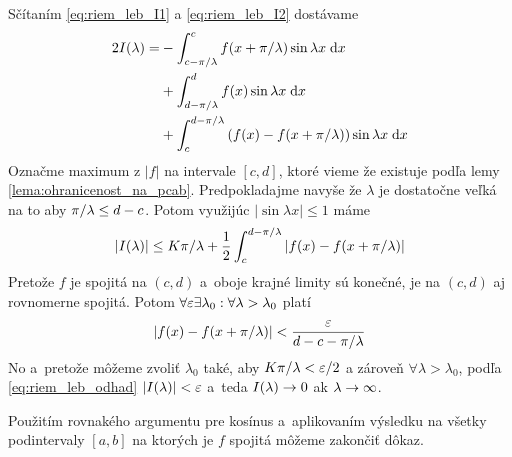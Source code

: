 \begin{dokaz}
    Sčítaním \eqref{eq:riem_leb_I1} a \eqref{eq:riem_leb_I2} dostávame
    \begin{equation*}
    \begin{split}
        2I(\lambda) =&-\int_{c-\pi/\lambda}^c f(x+\pi/\lambda) \sin \lambda x \; \mathrm{d} x 
                \\ &+
                \int_{d-\pi/\lambda}^d f(x) \sin \lambda x \; \mathrm{d} x \\
                &+
                \int_c^{d-\pi/\lambda} \left( 
                    f(x) - f(x+\pi/\lambda)
                    \right) \sin \lambda x \; \mathrm{d} x
    \end{split}
    \end{equation*}
    Označme maximum z $|f|$ na intervale $[c,d]$, ktoré vieme že
    existuje podľa lemy \eqref{lema:ohranicenost_na_pcab}.
    Predpokladajme navyše že $\lambda$ je dostatočne veľká na to aby
    $\pi/\lambda \le d-c$. Potom využijúc $|\sin \lambda x|\le1$ máme
    \begin{equation}
        |I(\lambda)| \le K \pi/\lambda + \frac{1}{2} \int_c^{d-\pi/\lambda}
            \left|f(x) - f(x+\pi/\lambda)\right|
        \label{eq:riem_leb_odhad}
    \end{equation}
    Pretože $f$ je spojitá na $(c,d)$ a~oboje krajné limity sú konečné,
    je na $(c,d)$ aj rovnomerne spojitá. 
    Potom $\forall \varepsilon \exists \lambda_0: \forall \lambda>\lambda_0$
    platí
    \begin{equation*}
        |f(x) - f(x+\pi/\lambda)| < \frac{\varepsilon}{d-c-\pi/\lambda}
    \end{equation*}
    No a~pretože môžeme zvoliť $\lambda_0$ také, aby $K \pi/\lambda < \varepsilon/2$
    a zároveň $\forall \lambda>\lambda_0$, podľa \eqref{eq:riem_leb_odhad}
    $|I(\lambda)|<\varepsilon$ a~teda $I(\lambda)\rightarrow0$ ak
    $\lambda\rightarrow\infty$.
    
    Použitím rovnakého argumentu pre kosínus a~aplikovaním výsledku 
    na všetky podintervaly $[a,b]$ na ktorých je $f$ spojitá môžeme
    zakončiť dôkaz.
\end{dokaz}

